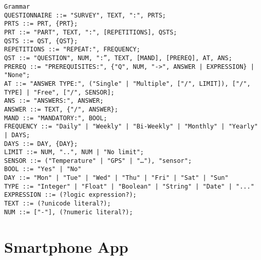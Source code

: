 \begin{verbatim}
Grammar
QUESTIONNAIRE ::= "SURVEY", TEXT, ":", PRTS;
PRTS ::= PRT, {PRT};
PRT ::= "PART", TEXT, ":", [REPETITIONS], QSTS;
QSTS ::= QST, {QST};
REPETITIONS ::= "REPEAT:", FREQUENCY;
QST ::= "QUESTION", NUM, ":”, TEXT, [MAND], [PREREQ], AT, ANS;    
PREREQ ::= "PREREQUISITES:", {"Q", NUM, "->", ANSWER | EXPRESSION} | "None";
AT ::= "ANSWER TYPE:", ("Single" | "Multiple", ["/", LIMIT]), ["/", TYPE] | "Free", ["/", SENSOR];
ANS ::= "ANSWERS:", ANSWER;
ANSWER ::= TEXT, {"/", ANSWER};
MAND ::= "MANDATORY:", BOOL;
FREQUENCY ::= "Daily" | "Weekly" | "Bi-Weekly" | "Monthly" | "Yearly" | DAYS;
DAYS ::= DAY, {DAY};
LIMIT ::= NUM, "..", NUM | "No limit";
SENSOR ::= ("Temperature" | "GPS" | "…"), "sensor";
BOOL ::= "Yes" | "No"
DAY ::= "Mon" | "Tue" | "Wed" | "Thu" | "Fri" | "Sat" | "Sun"
TYPE ::= "Integer" | "Float" | "Boolean" | "String" | "Date" | "..." 
EXPRESSION ::= (?logic expression?);
TEXT ::= (?unicode literal?);
NUM ::= ["-"], (?numeric literal?);
\end{verbatim}

\section{Smartphone App}
\label{sec:app}
